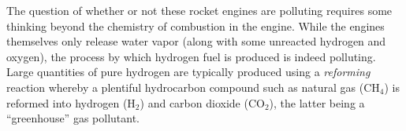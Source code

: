 \vskip 10pt

The question of whether or not these rocket engines are polluting requires some thinking beyond the chemistry of combustion in the engine.  While the engines themselves only release water vapor (along with some unreacted hydrogen and oxygen), the process by which hydrogen fuel is produced is indeed polluting.  Large quantities of pure hydrogen are typically produced using a {\it reforming} reaction whereby a plentiful hydrocarbon compound such as natural gas (CH$_{4}$) is reformed into hydrogen (H$_{2}$) and carbon dioxide (CO$_{2}$), the latter being a ``greenhouse'' gas pollutant.











